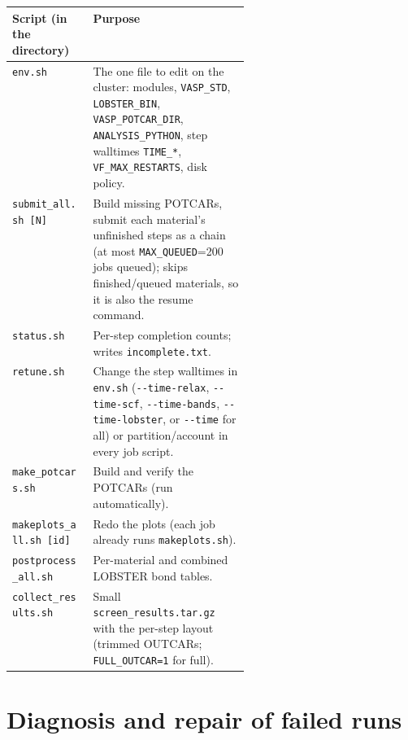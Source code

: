 \documentclass[11pt,a4paper]{scrartcl}
\newcommand{\thead}{\rowcolor{lightblue}}
\begin{document}
\begin{tabularx}{\linewidth}{@{}>{\raggedright\arraybackslash}p{0.34\linewidth}X@{}}
\thead
Script (in the directory) & Purpose \\ \midrule
\texttt{env.sh} & The one file to edit on the cluster: modules,
  \texttt{VASP\_STD}, \texttt{LOBSTER\_BIN}, \texttt{VASP\_POTCAR\_DIR},
  \texttt{ANALYSIS\_PYTHON}, step walltimes \texttt{TIME\_*},
  \texttt{VF\_MAX\_RESTARTS}, disk policy. \\
\texttt{submit\_all.sh [N]} & Build missing POTCARs, submit each material's
  unfinished steps as a chain (at most \texttt{MAX\_QUEUED}=200 jobs queued);
  skips finished/queued materials, so it is also the resume command. \\
\texttt{status.sh} & Per-step completion counts; writes \texttt{incomplete.txt}. \\
\texttt{retune.sh} & Change the step walltimes in \texttt{env.sh}
  (\texttt{-{}-time-relax}, \texttt{-{}-time-scf}, \texttt{-{}-time-bands},
  \texttt{-{}-time-lobster}, or \texttt{-{}-time} for all) or
  partition/account in every job script. \\
\texttt{make\_potcars.sh} & Build and verify the POTCARs (run automatically). \\
\texttt{makeplots\_all.sh [id]} & Redo the plots (each job already runs \texttt{makeplots.sh}). \\
\texttt{postprocess\_all.sh} & Per-material and combined LOBSTER bond tables. \\
\texttt{collect\_results.sh} & Small \texttt{screen\_results.tar.gz} with the
  per-step layout (trimmed OUTCARs; \texttt{FULL\_OUTCAR=1} for full). \\
\bottomrule
\end{tabularx}

\part{Diagnosis and repair of failed runs}
\label{part:check}
\end{document}
